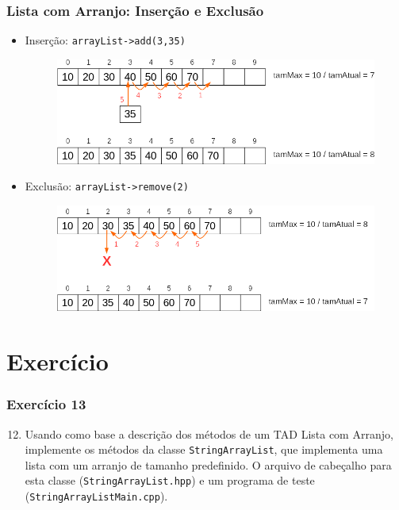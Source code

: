 \documentclass[aspectratio=169]{beamer}
\begin{document}
\begin{frame}\frametitle{Lista com Arranjo: Inserção e Exclusão}
\begin{itemize}
	\item Inserção: \texttt{arrayList->add(3,35)}
\begin{figure}[h]
	\centering
	\includegraphics[height=0.30\paperheight]{imagens/lista_com_arranjo_insercao.png}
\end{figure}
	\item Exclusão: \texttt{arrayList->remove(2)}
\begin{figure}[h]
	\centering
	\includegraphics[height=0.30\paperheight]{imagens/lista_com_arranjo_exclusao.png}
\end{figure}
\end{itemize}
\end{frame}

\section{Exercício}

\begin{frame}[fragile]\frametitle{Exercício 13}
\begin{enumerate}
        \setcounter{enumi}{11}
	\item Usando como base a descrição dos métodos de um TAD Lista com Arranjo, implemente os métodos da classe \texttt{StringArrayList}, que implementa uma lista com um arranjo de tamanho predefinido. O arquivo de cabeçalho para esta classe (\texttt{StringArrayList.hpp}) e um programa de teste (\texttt{StringArrayListMain.cpp}).
\end{enumerate}
\end{frame}
\end{document}
